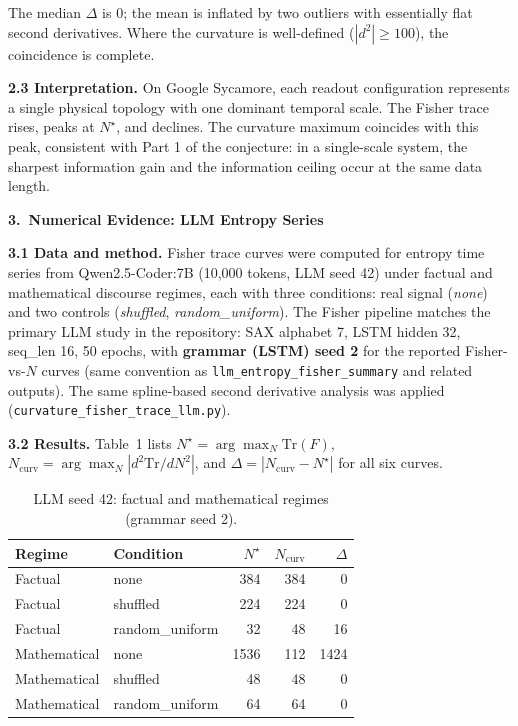 \documentclass[11pt,a4paper]{article}
\begin{document}
The median $\Delta$ is 0; the mean is inflated by two outliers with essentially flat second derivatives. Where the curvature is well-defined ($|d^2|\ge 100$), the coincidence is complete.

\textbf{2.3 Interpretation.} On Google Sycamore, each readout configuration represents a single physical topology with one dominant temporal scale. The Fisher trace rises, peaks at $N^\star$, and declines. The curvature maximum coincides with this peak, consistent with Part 1 of the conjecture: in a single-scale system, the sharpest information gain and the information ceiling occur at the same data length.

\vspace{0.5em}
\textbf{3.\ Numerical Evidence: LLM Entropy Series}

\textbf{3.1 Data and method.} Fisher trace curves were computed for entropy time series from Qwen2.5-Coder:7B (10{,}000 tokens, LLM seed 42) under factual and mathematical discourse regimes, each with three conditions: real signal (\emph{none}) and two controls (\emph{shuffled}, \emph{random\_uniform}). The Fisher pipeline matches the primary LLM study in the repository: SAX alphabet 7, LSTM hidden 32, seq\_len 16, 50 epochs, with \textbf{grammar (LSTM) seed 2} for the reported Fisher-vs-$N$ curves (same convention as \texttt{llm\_entropy\_fisher\_summary} and related outputs). The same spline-based second derivative analysis was applied (\texttt{curvature\_fisher\_trace\_llm.py}).

\textbf{3.2 Results.} Table~1 lists $N^\star=\arg\max_N \mathrm{Tr}(F)$, $N_{\mathrm{curv}}=\arg\max_N |d^2\mathrm{Tr}/dN^2|$, and $\Delta=|N_{\mathrm{curv}}-N^\star|$ for all six curves.

\begin{table}[htbp]
\centering
\caption{LLM seed 42: factual and mathematical regimes (grammar seed 2).}
\begin{tabular}{@{}llrrr@{}}
\toprule
Regime & Condition & $N^\star$ & $N_{\mathrm{curv}}$ & $\Delta$ \\
\midrule
Factual & none & 384 & 384 & 0 \\
Factual & shuffled & 224 & 224 & 0 \\
Factual & random\_uniform & 32 & 48 & 16 \\
Mathematical & none & 1536 & 112 & 1424 \\
Mathematical & shuffled & 48 & 48 & 0 \\
Mathematical & random\_uniform & 64 & 64 & 0 \\
\bottomrule
\end{tabular}
\end{table}
\end{document}
